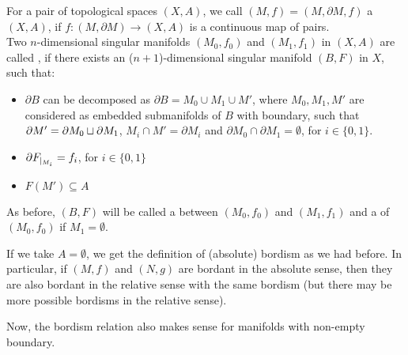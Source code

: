 \documentclass[a4paper,11pt]{article}
\begin{document}
\begin{definition}
    For a pair of topological spaces \((X,A)\), we call \((M,f)=(M,\partial M,f)\) a \((X,A)\), if \(f:(M,\partial M)\to (X,A)\) is a continuous map of pairs.\\
    Two \(n\)-dimensional singular manifolds \((M_0,f_0)\) and \((M_1,f_1)\) in \((X,A)\) are called , if there exists an (\(n+1\))-dimensional singular manifold \((B,F)\) in \(X\), such that:
    \begin{itemize}
        \item \(\partial B\) can be decomposed as  \(\partial B=M_0\cup M_1\cup M'\), where \(M_0,M_1,M'\) are considered as embedded submanifolds of \(B\) with boundary, such that 
        \(\partial M'=\partial M_0\sqcup \partial M_1\), 
        \(M_i\cap M'=\partial M_i\) and \(\partial M_0
        \cap\partial M_1=\emptyset\), for \(i\in\{0,1\}\).

        \item \(\partial F_{|_{M_i}}=f_i\), for \(i\in\{0,1\}\)

        \item \(F(M')\subseteq A\)
    \end{itemize}
    As before, \((B,F)\) will be called a  between \((M_0,f_0)\) and \((M_1,f_1)\) and a  of \((M_0,f_0)\) if \(M_1=\emptyset\).
\end{definition}

\begin{remark}
    If we take \(A=\emptyset\), we get the definition of (absolute) bordism as we had before. In particular, if \((M,f)\) and \((N,g)\) are bordant in the absolute sense, then they are also bordant in the relative sense with the same bordism (but there may be more possible bordisms in the relative sense).
\end{remark}

\begin{remark}
    Now, the bordism relation also makes sense for manifolds with non-empty boundary.
\end{remark}
\end{document}
